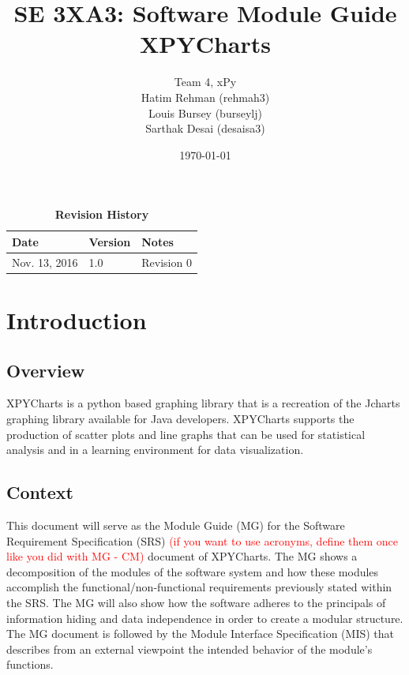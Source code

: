 \documentclass[12pt, titlepage]{article}
\title{SE 3XA3: Software Module Guide\\XPYCharts}
\author{Team 4, xPy
		\\ Hatim Rehman (rehmah3)
		\\ Louis Bursey (burseylj)
		\\ Sarthak Desai (desaisa3)
}
\date{\today}
\begin{document}
\maketitle

\tableofcontents
\listoftables
\listoffigures

\begin{table}[bp]
\caption{\bf Revision History}
\begin{tabularx}{\textwidth}{p{3cm}p{2cm}X}
\toprule {\bf Date} & {\bf Version} & {\bf Notes}\\
\midrule
Nov. 13, 2016 & 1.0 & Revision 0\\

\bottomrule
\end{tabularx}
\end{table}

\newpage


\section{Introduction}
\subsection{Overview}
XPYCharts is a python based graphing library that is a recreation of the Jcharts graphing library available for Java developers. XPYCharts supports the production of scatter plots and line graphs that can be used for statistical analysis and in a learning environment for data visualization.
\subsection{Context}
This document will serve as the Module Guide (MG) for the Software Requirement Specification (SRS) \textcolor{red}{(if you want to use acronyms, define them once like you did with MG - CM)} document of XPYCharts. The MG shows a decomposition of the modules of the software system and how these modules accomplish the functional/non-functional requirements previously stated within the SRS. The MG will also show how the software adheres to the principals of information hiding and data independence in order to create a modular structure. The MG document is followed by the Module Interface Specification (MIS) that describes from an external viewpoint the intended behavior of the module’s functions. 
\end{document}
